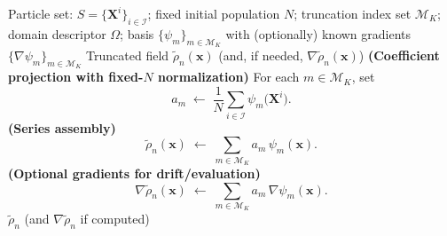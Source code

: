 \documentclass[12pt]{article}
\begin{document}
\begin{algorithm}
\caption{Interpolation Step (basis-agnostic, fixed-$N$ normalization)}\label{alg:interpolate}
\begin{algorithmic}
\Require Particle set: $S=\{ \mathbf{X}^i \}_{i\in \mathcal{I}}$; fixed initial population $N$; truncation index set $\mathcal{M}_K$; domain descriptor $\Omega$; basis $\{\psi_m\}_{m\in\mathcal{M}_K}$ with (optionally) known gradients $\{\nabla\psi_m\}_{m\in\mathcal{M}_K}$
\Ensure Truncated field $\tilde{\rho}_n(\mathbf{x})$ (and, if needed, $\nabla\tilde{\rho}_n(\mathbf{x})$)
    \State \textbf{(Coefficient projection with fixed-$N$ normalization)}
    \State For each $m\in\mathcal{M}_K$, set
    \[
      a_m \;\gets\; \frac{1}{N}\sum_{i\in\mathcal{I}} \psi_m\!\big(\mathbf{X}^i\big).
    \]
    \State \textbf{(Series assembly)}
    \[
      \tilde{\rho}_n(\mathbf{x}) \;\gets\; \sum_{m\in\mathcal{M}_K} a_m\,\psi_m(\mathbf{x}).
    \]
    \State \textbf{(Optional gradients for drift/evaluation)}
      \[
        \nabla\tilde{\rho}_n(\mathbf{x}) \;\gets\; \sum_{m\in\mathcal{M}_K} a_m\,\nabla\psi_m(\mathbf{x}).
      \]
    \EndIf
    \State \Return $\tilde{\rho}_n$ (and $\nabla\tilde{\rho}_n$ if computed)
\EndProcedure
\end{algorithmic}
\end{algorithm}
\end{document}
